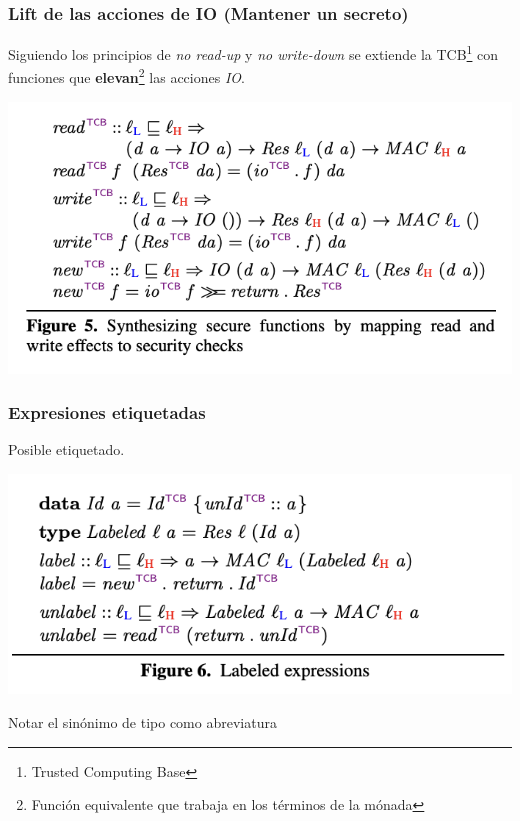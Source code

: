 \documentclass{beamer}
\begin{document}
\begin{frame}
    \frametitle{Lift de las acciones de IO (Mantener un secreto)}
    Siguiendo los principios de \textit{no read-up} y \textit{no write-down} se extiende la TCB\footnote{Trusted Computing Base} con funciones que \textbf{elevan}\footnote{Función equivalente que trabaja en los términos de la mónada} las acciones \textit{IO}.

    \begin{center}
        \includegraphics[scale=0.7]{figure5.png}
    \end{center}
\end{frame}

\begin{frame}
    \frametitle{Expresiones etiquetadas}

    Posible etiquetado.

    \begin{center}
        \includegraphics[scale=0.8]{figure6.png}
    \end{center}

    Notar el sinónimo de tipo como abreviatura  
\end{frame}
\end{document}
